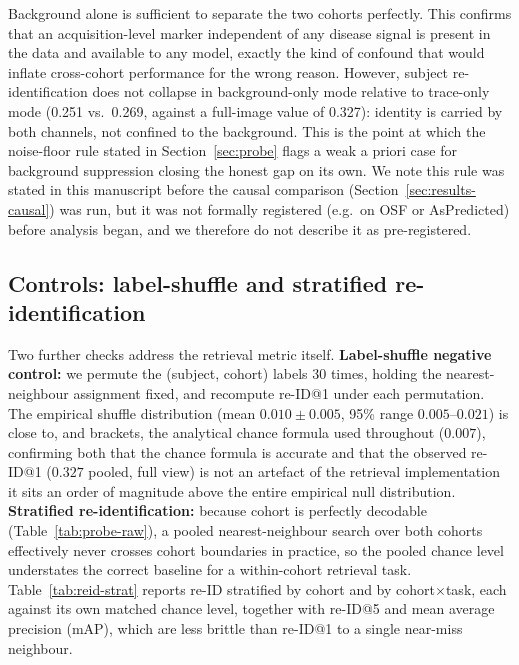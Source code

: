 \documentclass[3p,final,10pt]{elsarticle}
\let\oldsubsection\subsection
\renewcommand{\subsection}{\FloatBarrier\oldsubsection}
\begin{document}
Background alone is sufficient to separate the two cohorts perfectly. This
confirms that an acquisition-level marker independent of any disease
signal is present in the data and available to any model, exactly the
kind of confound that would inflate cross-cohort performance for the wrong
reason. However, subject re-identification does not collapse in
background-only mode relative to trace-only mode (0.251 vs.\ 0.269, against
a full-image value of 0.327): identity is carried by both channels, not
confined to the background. This is the point at which the noise-floor
rule stated in Section~\ref{sec:probe} flags a weak a priori case for
background suppression closing the honest gap on its own. We note this
rule was stated in this manuscript before the causal comparison
(Section~\ref{sec:results-causal}) was run, but it was not formally
registered (e.g.\ on OSF or AsPredicted) before analysis began, and we
therefore do not describe it as pre-registered.

\subsection{Controls: label-shuffle and stratified re-identification}
\label{sec:reid-controls}
Two further checks address the retrieval metric itself. \textbf{Label-shuffle
negative control:} we permute the (subject, cohort) labels 30 times,
holding the nearest-neighbour assignment fixed, and recompute
re-ID@1 under each permutation. The empirical shuffle distribution
(mean $0.010\pm0.005$, 95\% range $0.005$--$0.021$) is close to, and
brackets, the analytical chance formula used throughout ($0.007$),
confirming both that the chance formula is accurate and that the observed
re-ID@1 ($0.327$ pooled, full view) is not an artefact of the retrieval
implementation it sits an order of magnitude above the entire empirical
null distribution. \textbf{Stratified re-identification:} because cohort is
perfectly decodable (Table~\ref{tab:probe-raw}), a pooled nearest-neighbour
search over both cohorts effectively never crosses cohort boundaries in
practice, so the pooled chance level understates the correct baseline for
a within-cohort retrieval task. Table~\ref{tab:reid-strat} reports re-ID
stratified by cohort and by cohort$\times$task, each against its own
matched chance level, together with re-ID@5 and mean average precision
(mAP), which are less brittle than re-ID@1 to a single near-miss neighbour.
\end{document}
